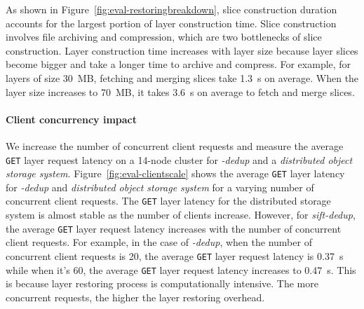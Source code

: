 As shown in Figure~\ref{fig:eval-restoringbreakdown}, slice construction duration accounts for the largest portion of layer construction time.
Slice construction involves file archiving and compression, which are two bottlenecks of slice construction. 
Layer construction time increases with layer size because layer slices become bigger and take a longer time to archive and compress.
For example, for layers of size 30~MB, fetching and merging slices take 1.3~s on average.
When the layer size increases to 70~MB, it takes 3.6~s on average to fetch and merge slices.

\paragraph{Client concurrency impact}
We increase the number of concurrent client requests and measure the average \texttt{GET} layer request latency on a 14-node cluster for \emph{\sysname-dedup} and a \emph{distributed object storage system}.
%
Figure~\ref{fig:eval-clientscale} shows
the average \texttt{GET} layer latency for \emph{\sysname-dedup} and \emph{distributed object storage system} for a varying number of concurrent client requests.
The \texttt{GET} layer latency for the distributed storage system is almost stable as the number of clients increase.
However, for \emph{sift-dedup}, the average \texttt{GET} layer request latency increases with the number of concurrent client requests.
For example, in the case of \emph{\sysname-dedup}, when the number of concurrent client requests is 20, the average \texttt{GET} layer request latency is 0.37~s while when it's 60, the average \texttt{GET} layer request latency  increases to 0.47~s.
This is because layer restoring process is computationally intensive.
The more concurrent requests, the higher the layer restoring overhead.

